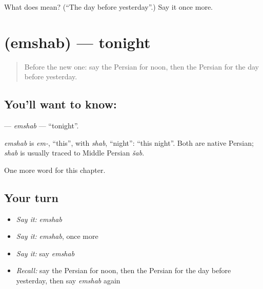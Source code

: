 \begin{tcolorbox}[breakable,colback=teal!4,colframe=teal!35!black,title={Before you move on}]
What does  mean? (\textquotedblleft{}The day before yesterday\textquotedblright{}.) Say it once more.
\end{tcolorbox}
\section[\texorpdfstring{\fa{امشب} (emshab)}{امشب (emshab)}]{ (emshab) — tonight}

\label{lesson:FA-C79-emshab}



\begin{quote}
Before the new one: say the Persian for noon, then the Persian for the day before yesterday.
\end{quote}

\subsection*{You'll want to know: }
\textbf{} — \emph{emshab} — \textquotedblleft{}tonight\textquotedblright{}.

\begin{cousinweb}
\emph{emshab} is \emph{em-}, \textquotedblleft{}this\textquotedblright{}, with \emph{shab}, \textquotedblleft{}night\textquotedblright{}: \textquotedblleft{}this night\textquotedblright{}. Both are native Persian; \emph{shab} is usually traced to Middle Persian \emph{šab}.
\end{cousinweb}

\begin{grammarlens}[title={What you've built}]
One more word for this chapter.
\end{grammarlens}

\subsection*{Your turn}
\begin{itemize}
\raggedright
  \item \emph{Say it:} \emph{emshab}
  \item \emph{Say it:} \emph{emshab}, once more
  \item \emph{Say it:} say \emph{emshab}
  \item \emph{Recall:} say the Persian for noon, then the Persian for the day before yesterday, then say \emph{emshab} again
\end{itemize}

